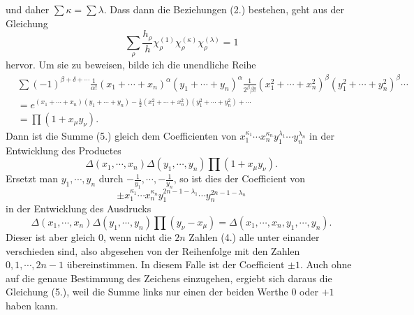 \documentclass[11pt]{article}
\begin{document}
und daher $\sum\kappa=
\sum\lambda$. Dass dann die Beziehungen (2.) bestehen, geht aus der Gleichung
\begin{equation}\tag{5.}
 \sum_\rho\frac{h_\rho}{h}\chi_\rho^{(1)}\chi_\rho^{(\kappa)}\chi_\rho^{(\lambda)}=1
\end{equation}
hervor. Um sie zu beweisen, bilde ich die unendliche Reihe
\[
\begin{aligned}
 &\sum (-1)^{\beta+
\delta+
\cdots}\frac1{\alpha!}(x_1+
\cdots+x_n)^\alpha(y_1+
\cdots+y_n)^\alpha
 \frac1{2^\beta\beta!}(x_1^2+
\cdots+x_n^2)^\beta(y_1^2+
\cdots+y_n^2)^\beta\cdots\\
 &=e^{(x_1+
\cdots+x_n)(y_1+
\cdots+y_n)-\frac12(x_1^2+
\cdots+x_n^2)(y_1^2+
\cdots+y_n^2)+
\cdots}\\
 &=\prod(1+x_\mu y_\nu).
\end{aligned}
\]
Dann ist die Summe (5.) gleich dem Coefficienten von $x_1^{\kappa_1}\cdots x_n^{\kappa_n}y_1^{\lambda_1}\cdots y_n^{\lambda_n}$ in der Entwicklung des Productes
\[
 \Delta(x_1,
\cdots,x_n)\Delta(y_1,
\cdots,y_n)\prod(1+x_\mu y_\nu).
\]
Ersetzt man $y_1,
\cdots,y_n$ durch $-\frac1{y_1},
\cdots,-\frac1{y_n}$, so ist dies der Coefficient von
\[
\pm x_1^{\kappa_1}\cdots x_n^{\kappa_n}
y_1^{2n-1-\lambda_1}\cdots y_n^{2n-1-\lambda_n}
\]
in der Entwicklung des Ausdrucks
\[
 \Delta(x_1,
\cdots,x_n)\Delta(y_1,
\cdots,y_n)\prod(y_\nu-x_\mu)=\Delta(x_1,
\cdots,x_n,y_1,
\cdots,y_n).
\]
Dieser ist aber gleich $0$, wenn nicht die $2n$ Zahlen (4.) alle unter einander verschieden sind, also abgesehen von der Reihenfolge mit den Zahlen $0,1,
\cdots,2n-1$ übereinstimmen. In diesem Falle ist der Coefficient $\pm1$. Auch ohne auf die genaue Bestimmung des Zeichens einzugehen, ergiebt sich daraus die Gleichung (5.), weil die Summe links nur einen der beiden Werthe $0$ oder $+1$ haben kann.
\end{document}
